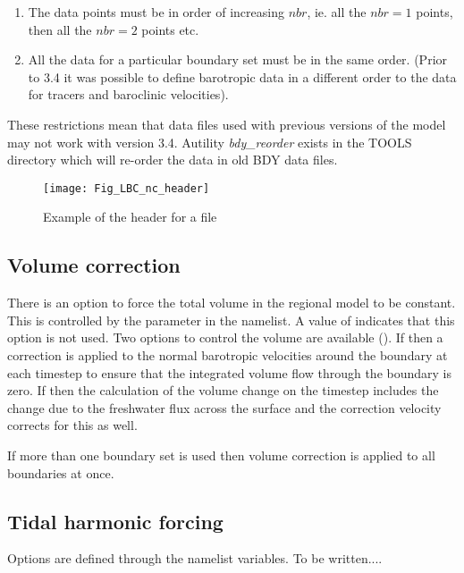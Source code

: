 \documentclass[../main/NEMO_manual]{subfiles}
\begin{document}
\begin{enumerate}
\item The data points must be in order of increasing $nbr$,
  ie. all the $nbr=1$ points, then all the $nbr=2$ points etc.
\item All the data for a particular boundary set must be in the same order.
  (Prior to 3.4 it was possible to define barotropic data in a different order to
  the data for tracers and baroclinic velocities). 
\end{enumerate}

These restrictions mean that data files used with previous versions of the model may not work with version 3.4.
A\fortran utility {\it bdy\_reorder} exists in the TOOLS directory which
will re-order the data in old BDY data files. 

\begin{figure}[!t]
  \begin{center}
    \texttt{[image: Fig\_LBC\_nc\_header]}
    \caption {
      \protect\label{fig:LBC_nc_header}
      Example of the header for a \protect{} file
    }
  \end{center}
\end{figure}

\subsection{Volume correction}
\label{subsec:BDY_vol_corr}

There is an option to force the total volume in the regional model to be constant.
This is controlled  by the  parameter in the namelist.
A value of  indicates that this option is not used.
Two options to control the volume are available (). 
If  then a correction is applied to the normal barotropic velocities around the boundary at
each timestep to ensure that the integrated volume flow through the boundary is zero.
If  then the calculation of the volume change on
the timestep includes the change due to the freshwater flux across the surface and
the correction velocity corrects for this as well.

If more than one boundary set is used then volume correction is
applied to all boundaries at once.

\newpage
\subsection{Tidal harmonic forcing}
\label{subsec:BDY_tides}



Options are defined through the   namelist variables.
 To be written....

\biblio

\pindex
\end{document}
